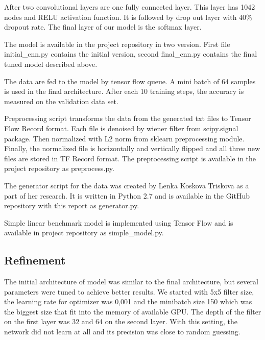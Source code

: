 \documentclass{article}
\begin{document}
After two convolutional layers are one fully connected layer. This layer
has 1042 nodes and RELU activation function. It is followed by drop out
layer with 40\% dropout rate. The final layer of our model is the
softmax layer.

The model is available in the project repository in two version. First
file initial\_cnn.py contains the initial version, second final\_cnn.py
contains the final tuned model described above.

The data are fed to the model by tensor flow queue. A mini batch of 64
samples is used in the final architecture. After each 10 training steps,
the accuracy is measured on the validation data set.

Preprocessing script transforms the data from the generated txt files to
Tensor Flow Record format. Each file is denoised by wiener filter from
scipy.signal package. Then normalized with L2 norm from sklearn
preprocessing module. Finally, the normalized file is horizontally and
vertically flipped and all three new files are stored in TF Record
format. The preprocessing script is available in the project repository
as preprocess.py.

The generator script for the data was created by Lenka Koskova Triskova
as a part of her research. It is written in Python 2.7 and is available
in the GitHub repository with this report as generator.py.

Simple linear benchmark model is implemented using Tensor Flow and is
available in project repository as simple\_model.py.

\subsection{Refinement}\label{refinement}

The initial architecture of model was similar to the final architecture,
but several parameters were tuned to achieve better results. We started
with 5x5 filter size, the learning rate for optimizer was 0,001 and the
minibatch size 150 which was the biggest size that fit into the memory
of available GPU. The depth of the filter on the first layer was 32 and
64 on the second layer. With this setting, the network did not learn at
all and its precision was close to random guessing.
\end{document}
